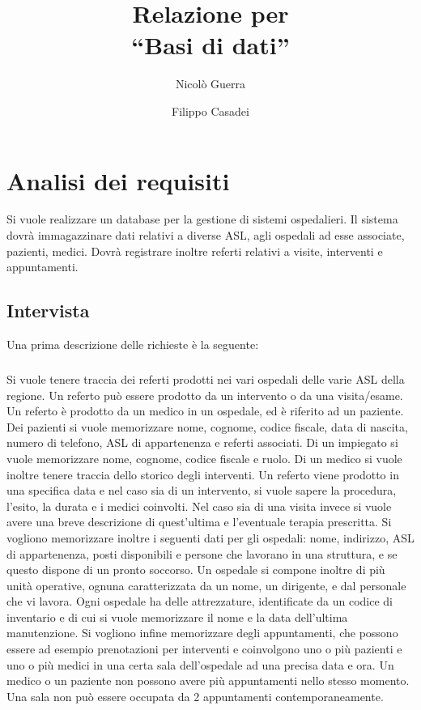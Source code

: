 \documentclass[a4paper,12pt]{report}
\title{Relazione per\\``Basi di dati''}
\author{Nicolò Guerra \and
Filippo Casadei}
\begin{document}
\maketitle

\tableofcontents

\chapter{Analisi dei requisiti}

Si vuole realizzare un database per la gestione di sistemi ospedalieri. Il sistema dovrà immagazzinare dati relativi a diverse ASL,
agli ospedali ad esse associate, pazienti, medici. Dovrà registrare inoltre referti relativi a visite, interventi e appuntamenti.

\section{Intervista}
Una prima descrizione delle richieste è la seguente:
\paragraph{}
Si vuole tenere traccia dei referti prodotti nei vari ospedali delle varie ASL della regione. Un referto può essere prodotto da un
intervento o da una visita/esame. Un referto è prodotto da un medico in un ospedale, ed è riferito ad un paziente. Dei pazienti si
vuole memorizzare nome, cognome, codice fiscale, data di nascita, numero di telefono, ASL di appartenenza e referti associati.
Di un impiegato si vuole memorizzare nome, cognome, codice fiscale e ruolo. Di un medico si vuole inoltre tenere traccia dello
storico degli interventi.
Un referto viene prodotto in una specifica data e nel caso sia di un intervento, si vuole sapere la procedura, l'esito, la durata e i medici
coinvolti. Nel caso sia di una visita invece si vuole avere una breve descrizione di quest'ultima e l'eventuale terapia prescritta.
Si vogliono memorizzare inoltre i seguenti dati per gli ospedali: nome, indirizzo, ASL di appartenenza, posti disponibili e persone
che lavorano in una struttura, e se questo dispone di un pronto soccorso.
Un ospedale si compone inoltre di più unità operative, ognuna caratterizzata da un nome, un dirigente, e dal personale che vi lavora.
Ogni ospedale ha delle attrezzature, identificate da un codice di inventario e di cui si vuole memorizzare il nome e la data dell'ultima
manutenzione.
Si vogliono infine memorizzare degli appuntamenti, che possono essere ad esempio prenotazioni per interventi e coinvolgono uno o più
pazienti e uno o più medici in una certa sala dell'ospedale ad una precisa data e ora. Un medico o un paziente non possono avere più
appuntamenti nello stesso momento. Una sala non può essere occupata da 2 appuntamenti contemporaneamente.
\end{document}
